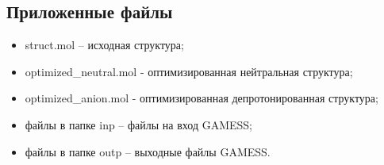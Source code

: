 \subsection{Приложенные файлы}
\begin{itemize}
    \item struct.mol – исходная структура;
    \item optimized\_neutral.mol - оптимизированная нейтральная структура;
    \item optimized\_anion.mol - оптимизированная депротонированная структура;
    \item файлы в папке inp – файлы на вход GAMESS;
    \item файлы в папке outp – выходные файлы GAMESS.
\end{itemize}{}
